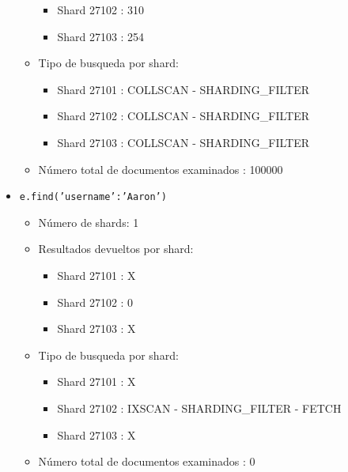 \documentclass{article}
\begin{document}
\begin{itemize}
\begin{itemize}
\begin{itemize}
              \item Shard 27102 : 310
              \item Shard 27103 : 254
            \end{itemize}
          \item Tipo de busqueda por shard:
            \begin{itemize}
              \item Shard 27101 : COLLSCAN - SHARDING\_FILTER
              \item Shard 27102 : COLLSCAN - SHARDING\_FILTER
              \item Shard 27103 : COLLSCAN - SHARDING\_FILTER
            \end{itemize}
          \item Número total de documentos examinados : 100000
        \end{itemize}
      \item \texttt{e.find({'username':'Aaron'})}
        \begin{itemize}
          \item Número de shards: 1
          \item Resultados devueltos por shard:
            \begin{itemize}
              \item Shard 27101 : X
              \item Shard 27102 : 0
              \item Shard 27103 : X
            \end{itemize}
          \item Tipo de busqueda por shard:
            \begin{itemize}
              \item Shard 27101 : X
              \item Shard 27102 : IXSCAN - SHARDING\_FILTER - FETCH
              \item Shard 27103 : X
            \end{itemize}
          \item Número total de documentos examinados : 0
        \end{itemize}
    \end{itemize}
\end{document}
